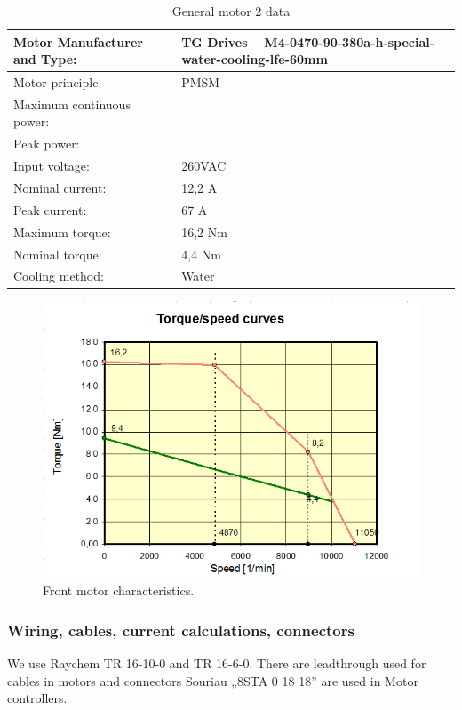 \begin{table}[H]
	\centering
	\caption{General motor 2 data}
	\begin{tabularx}{\textwidth}{|X|X|}\hline
		Motor Manufacturer and Type: & TG Drives – M4-0470-90-380a-h-special-water-cooling-lfe-60mm \\[\TableSize]\hline
		Motor principle & PMSM \\[\TableSize]\hline
		Maximum continuous power: &  \\[\TableSize]\hline
		Peak power: &  \\[\TableSize]\hline
		Input voltage: & 260VAC \\[\TableSize]\hline
		Nominal current: & 12,2 A \\[\TableSize]\hline
		Peak current: & 67 A \\[\TableSize]\hline
		Maximum torque: & 16,2 Nm \\[\TableSize]\hline
		Nominal torque: & 4,4 Nm \\[\TableSize]\hline
		Cooling method: & Water \\[\TableSize]\hline
	\end{tabularx}%
	\label{tab:motors2-general}%
\end{table}%

\begin{figure}[H]
	\centering
	\includegraphics[width=\textwidth]{./img/MOTOR2-torque.png}
	\caption{Front motor characteristics.}
	\label{fig:torque2}
\end{figure}


\subsubsection{Wiring, cables, current calculations, connectors}
We use Raychem TR 16-10-0 and TR 16-6-0. There are leadthrough used for cables in motors and connectors Souriau „8STA 0 18 18” are used in Motor controllers.

